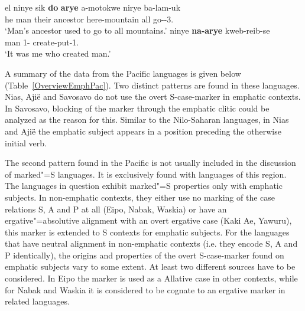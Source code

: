 \begin{exe}
\ex{}
\begin{xlist}
\ex\gll el ninye sik \textbf{do} \textbf{arye} a-motokwe nirye ba-lam-uk\\
he man their ancestor \sbj{} here-mountain all go-\hab{}-3\sg{}.\pstrem{}\\
\glt `Man's ancestor used to go to all mountains.'
\ex\gll ninye \textbf{na-arye} kweb-reib-se\\
man 1-\sbj{} create-put-1\sg{}.\pstrem{}\\
\glt `It was me who created man.'
\end{xlist}
\end{exe}


A summary of the data from the Pacific languages is given below (Table~\ref{OverviewEmphPac}).
Two distinct patterns are found in these languages. 
Nias, Aji\"e and Savosavo do not use the overt S-case-marker in emphatic contexts. 
In Savosavo, blocking of the marker through the emphatic clitic could be analyzed as the reason for this. 
Similar to the Nilo-Saharan languages, in Nias and Aji\"e the emphatic subject appears in a position preceding the otherwise initial verb.

The second pattern found in the Pacific is not usually included in the discussion of marked"=S languages. 
It is exclusively found with languages of this region.
The languages in question exhibit marked"=S properties only with emphatic subjects. 
In non-emphatic contexts, they either use no marking of the case relations S, A and P at all (Eipo, Nabak, Waskia) or have an ergative"=absolutive alignment with an overt ergative case (Kaki Ae, Yawuru), this marker is extended to S contexts for emphatic subjects. 
For the languages that have neutral alignment in non-emphatic contexts (i.e. they encode S, A and P identically), the origins and properties of the overt S-case-marker found on emphatic subjects vary to some extent. 
At least two different sources have to be considered. 
In Eipo the marker is used as a Allative case in other contexts, while for Nabak and Waskia it is considered to be cognate to an ergative marker in related languages.  

